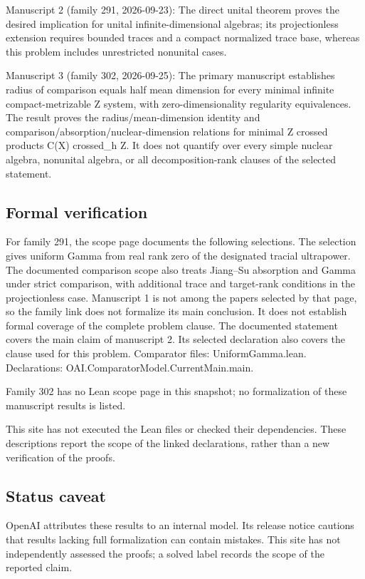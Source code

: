 \documentclass[11pt]{article}
\begin{document}
Manuscript 2 (family 291, 2026-09-23): The direct unital theorem proves the desired implication for unital infinite-dimensional algebras; its projectionless extension requires bounded traces and a compact normalized trace base, whereas this problem includes unrestricted nonunital cases.

Manuscript 3 (family 302, 2026-09-25): The primary manuscript establishes radius of comparison equals half mean dimension for every minimal infinite compact-metrizable Z system, with zero-dimensionality regularity equivalences. The result proves the radius/mean-dimension identity and comparison/absorption/nuclear-dimension relations for minimal Z crossed products C(X) crossed\_h Z. It does not quantify over every simple nuclear algebra, nonunital algebra, or all decomposition-rank clauses of the selected statement.

\subsection{Formal verification}
For family 291, the scope page documents the following selections. The selection gives uniform Gamma from real rank zero of the designated tracial ultrapower. The documented comparison scope also treats Jiang--Su absorption and Gamma under strict comparison, with additional trace and target-rank conditions in the projectionless case. Manuscript 1 is not among the papers selected by that page, so the family link does not formalize its main conclusion. It does not establish formal coverage of the complete problem clause. The documented statement covers the main claim of manuscript 2. Its selected declaration also covers the clause used for this problem. Comparator files: UniformGamma.lean. Declarations: OAI.ComparatorModel.CurrentMain.main.

Family 302 has no Lean scope page in this snapshot; no formalization of these manuscript results is listed.

This site has not executed the Lean files or checked their dependencies. These descriptions report the scope of the linked declarations, rather than a new verification of the proofs.

\subsection{Status caveat}
OpenAI attributes these results to an internal model. Its release notice cautions that results lacking full formalization can contain mistakes. This site has not independently assessed the proofs; a solved label records the scope of the reported claim.
\end{document}
